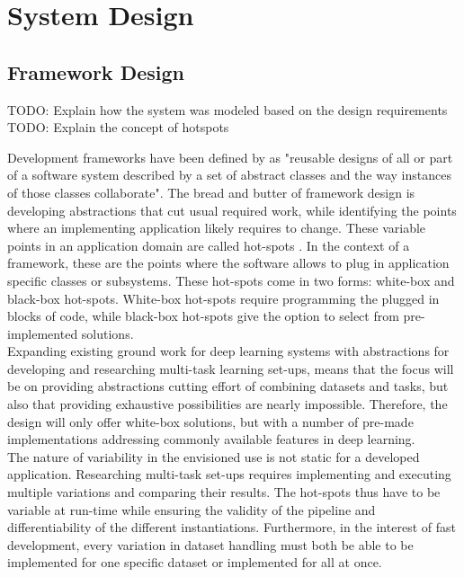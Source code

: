 \chapter{System Design} \label{Design}





\section{Framework Design} \label{Design:Framework}
TODO: Explain how the system was modeled based on the design requirements
TODO: Explain the concept of hotspots

Development frameworks have been defined by \cite{roberts1996evolving} as "reusable designs of all or part of a software system described by a set of abstract classes and the way instances of those classes collaborate". The bread and butter of framework design is developing abstractions that cut usual required work, while identifying the points where an implementing application likely requires to change. These variable points in an application domain are called hot-spots \cite{schmid1997systematic}. In the context of a framework, these are the points where the software allows to plug in application specific classes or subsystems. These hot-spots come in two forms: white-box and black-box hot-spots. White-box hot-spots require programming the plugged in blocks of code, while black-box hot-spots give the option to select from pre-implemented solutions. \\

Expanding existing ground work for deep learning systems with abstractions for developing and researching multi-task learning set-ups, means that the focus will be on providing abstractions cutting effort of combining datasets and tasks, but also that providing exhaustive possibilities are nearly impossible. Therefore, the design will only offer white-box solutions, but with a number of pre-made implementations addressing commonly available features in deep learning.\\

The nature of variability in the envisioned use is not static for a developed application. Researching multi-task set-ups requires implementing and executing multiple variations and comparing their results. The hot-spots thus have to be variable at run-time while ensuring the validity of the pipeline and differentiability of the different instantiations. Furthermore, in the interest of fast development, every variation in dataset handling must both be able to be implemented for one specific dataset or implemented for all at once.\\




